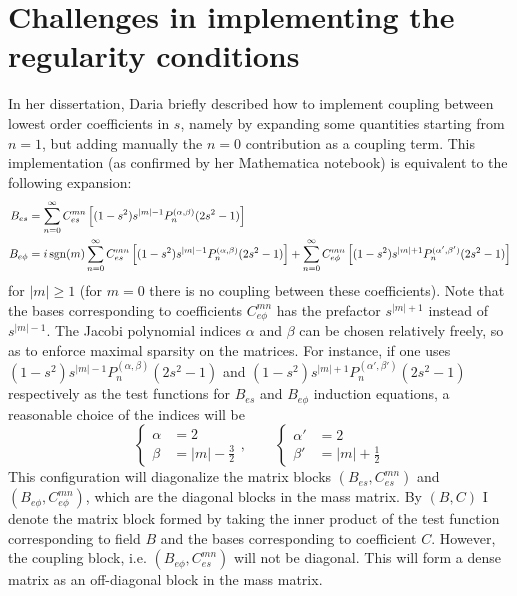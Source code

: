 \section{Challenges in implementing the regularity conditions}


In her dissertation, Daria briefly described how to implement coupling between lowest order coefficients in $s$, namely by expanding some quantities starting from $n=1$, but adding manually the $n=0$ contribution as a coupling term. This implementation (as confirmed by her Mathematica notebook) is equivalent to the following expansion:
\begin{equation}
\begin{aligned}
    B_{es} &= \sum_{n=0}^\infty C_{es}^{mn} \left[(1-s^2) s^{|m|-1} P_n^{(\alpha, \beta)}(2s^2 - 1)\right] \\ 
    B_{e\phi} &= i\operatorname{sgn}(m)\sum_{n=0}^\infty C_{es}^{mn} \left[(1-s^2) s^{|m|-1} P_n^{(\alpha, \beta)}(2s^2 - 1)\right] + \sum_{n=0}^\infty C_{e\phi}^{mn} \left[(1-s^2) s^{|m|+1} P_n^{(\alpha', \beta')}(2s^2 - 1)\right]
\end{aligned}
\end{equation}
for $|m|\geq 1$ (for $m=0$ there is no coupling between these coefficients). 
Note that the bases corresponding to coefficients $C_{e\phi}^{mn}$ has the prefactor $s^{|m|+1}$ instead of $s^{|m|-1}$. 
The Jacobi polynomial indices $\alpha$ and $\beta$ can be chosen relatively freely, so as to enforce maximal sparsity on the matrices. 
For instance, if one uses $(1 - s^2) s^{|m|-1}P_n^{(\alpha, \beta)}(2s^2 - 1)$ and $(1 - s^2) s^{|m|+1}P_n^{(\alpha', \beta')}(2s^2 - 1)$ respectively as the test functions for $B_{es}$ and $B_{e\phi}$ induction equations, a reasonable choice of the indices will be
\[
    \left\{\begin{aligned}
        \alpha &= 2 \\ 
        \beta &= |m| - \frac{3}{2}
    \end{aligned}\right.,\qquad 
    \left\{\begin{aligned}
        \alpha' &= 2 \\
        \beta' &= |m| + \frac{1}{2}
    \end{aligned}\right.
\]
This configuration will diagonalize the matrix blocks $(B_{es}, C_{es}^{mn})$ and $(B_{e\phi}, C_{e\phi}^{mn})$, which are the diagonal blocks in the mass matrix. By $(B, C)$ I denote the matrix block formed by taking the inner product of the test function corresponding to field $B$ and the bases corresponding to coefficient $C$. 
However, the coupling block, i.e. $(B_{e\phi}, C_{es}^{mn})$ will not be diagonal. This will form a dense matrix as an off-diagonal block in the mass matrix.

